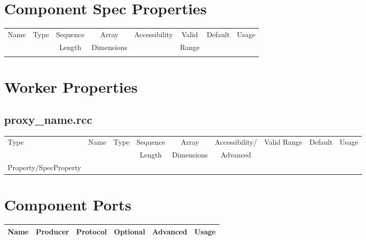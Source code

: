 \documentclass{article}
\def\comp{proxy\_name}
\begin{document}
\begin{landscape}
	\section*{Component Spec Properties}
	\begin{scriptsize}
		\begin{tabular}{|p{3cm}|p{1.5cm}|c|c|c|c|c|p{7cm}|}
			\hline
			\rowcolor{blue}
			Name & Type & Sequence & Array      & Accessibility & Valid & Default & Usage \\
			\rowcolor{blue}
			     &      & Length   & Dimensions &               & Range &         &       \\
			\hline
			     &      &          &            &               &       &         &       \\
			\hline
		\end{tabular}
	\end{scriptsize}
	\section*{Worker Properties}

	\subsection*{\comp.rcc}
	\begin{scriptsize}
		\begin{tabular}{|p{3cm}|p{2cm}|p{1cm}|c|c|c|c|c|p{5cm}|}
			\hline
			\rowcolor{blue}
			Type & Name & Type & Sequence & Array      & Accessibility/ & Valid Range & Default & Usage \\
			\rowcolor{blue}
			     &      &      & Length   & Dimensions & Advanced       &             &         &       \\
			\hline
			Property/SpecProperty & & & & & & & \\
			\hline
		\end{tabular}
	\end{scriptsize}


	\section*{Component Ports}
	\begin{scriptsize}
		\begin{tabular}{|M{2cm}|M{1.5cm}|M{4cm}|c|c|M{9cm}|}
			\hline
			\rowcolor{blue}
			Name & Producer & Protocol & Optional & Advanced & Usage \\
			\hline


\end{tabular}
\end{scriptsize}
\end{landscape}
\end{document}
